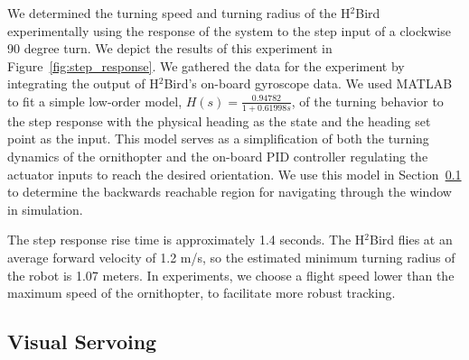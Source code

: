 \documentclass{aamas2013}
\begin{document}
We determined the turning speed and turning radius of the H$^2$Bird
experimentally using the response of the system to the step input of a
clockwise 90 degree turn. We depict the results of this experiment in
Figure~\ref{fig:step_response}. We gathered the data for the experiment by 
integrating the output of H$^2$Bird's on-board gyroscope data. We used MATLAB to
fit a simple low-order model, $H(s) = \frac{0.94782}{1+0.61998s}$, of the
turning behavior to the step response with the physical heading as the state
and the heading set point as the input. This model serves as a simplification
of both the turning dynamics of the ornithopter and the on-board PID
controller regulating the actuator inputs to reach the desired orientation. We
use this model in Section~\ref{sec:visual_servoing} to determine the backwards
reachable region for navigating through the window in simulation.

The step response rise time is approximately 1.4 seconds. The H$^2$Bird
flies at an average forward velocity of 1.2 m/s, so the estimated minimum
turning radius of the robot is 1.07 meters. In experiments, we choose a flight
speed lower than the maximum speed of the ornithopter, to facilitate more
robust tracking.

\subsection{Visual Servoing}
\label{sec:visual_servoing}
\end{document}

